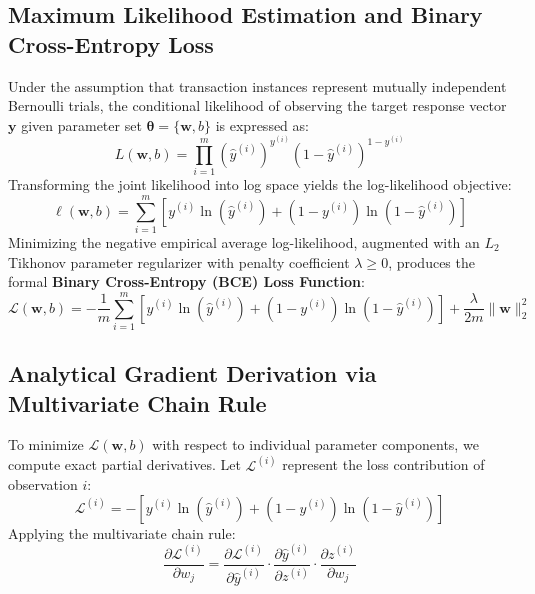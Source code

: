 \documentclass[11pt,a4paper]{article}
\begin{document}
\subsection{Maximum Likelihood Estimation and Binary Cross-Entropy Loss}
Under the assumption that transaction instances represent mutually independent Bernoulli trials, the conditional likelihood of observing the target response vector $\mathbf{y}$ given parameter set $\boldsymbol{\theta} = \{\mathbf{w}, b\}$ is expressed as:
\begin{equation}
    L(\mathbf{w}, b) = \prod_{i=1}^m \left(\hat{y}^{(i)}\right)^{y^{(i)}} \left(1 - \hat{y}^{(i)}\right)^{1 - y^{(i)}}
\end{equation}
Transforming the joint likelihood into log space yields the log-likelihood objective:
\begin{equation}
    \ell(\mathbf{w}, b) = \sum_{i=1}^m \left[ y^{(i)} \ln\left(\hat{y}^{(i)}\right) + \left(1 - y^{(i)}\right) \ln\left(1 - \hat{y}^{(i)}\right) \right]
\end{equation}
Minimizing the negative empirical average log-likelihood, augmented with an $L_2$ Tikhonov parameter regularizer with penalty coefficient $\lambda \ge 0$, produces the formal \textbf{Binary Cross-Entropy (BCE) Loss Function}:
\begin{equation}
    \mathcal{L}(\mathbf{w}, b) = -\frac{1}{m} \sum_{i=1}^m \left[ y^{(i)} \ln\left(\hat{y}^{(i)}\right) + \left(1 - y^{(i)}\right) \ln\left(1 - \hat{y}^{(i)}\right) \right] + \frac{\lambda}{2m} \|\mathbf{w}\|_2^2
    \label{eq:bce_loss}
\end{equation}

\subsection{Analytical Gradient Derivation via Multivariate Chain Rule}
To minimize $\mathcal{L}(\mathbf{w}, b)$ with respect to individual parameter components, we compute exact partial derivatives. Let $\mathcal{L}^{(i)}$ represent the loss contribution of observation $i$:
\begin{equation}
    \mathcal{L}^{(i)} = -\left[ y^{(i)} \ln\left(\hat{y}^{(i)}\right) + \left(1 - y^{(i)}\right) \ln\left(1 - \hat{y}^{(i)}\right) \right]
\end{equation}
Applying the multivariate chain rule:
\begin{equation}
    \frac{\partial \mathcal{L}^{(i)}}{\partial w_j} = \frac{\partial \mathcal{L}^{(i)}}{\partial \hat{y}^{(i)}} \cdot \frac{\partial \hat{y}^{(i)}}{\partial z^{(i)}} \cdot \frac{\partial z^{(i)}}{\partial w_j}
\end{equation}
\end{document}
